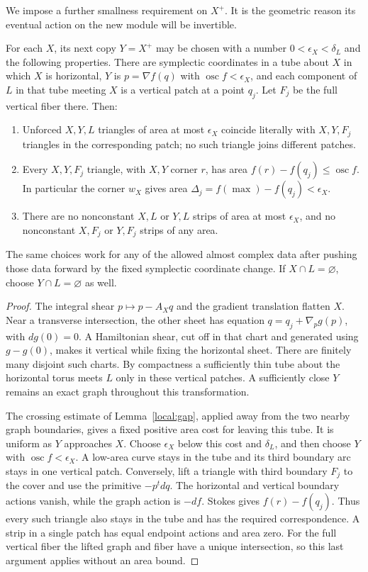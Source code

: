 We impose a further smallness requirement on $X^+$.  It is the geometric
reason its eventual action on the new module will be invertible.

\begin{lemma}\label{local:comparison}
For each $X$, its next copy $Y=X^+$ may be chosen with a number
$0<\epsilon_X<\delta_L$ and the following properties.  There are symplectic
coordinates in a tube about $X$ in which $X$ is horizontal, $Y$ is
$p=\nabla f(q)$ with $\operatorname{osc}f<\epsilon_X$, and each component
of $L$ in that tube meeting $X$ is a vertical patch at a point $q_j$.
Let $F_j$ be the full vertical fiber there.  Then:
\begin{enumerate}[label=(\roman*)]
\item Unforced $X,Y,L$ triangles of area at most $\epsilon_X$ coincide
literally with $X,Y,F_j$ triangles in the corresponding patch; no such
triangle joins different patches.
\item Every $X,Y,F_j$ triangle, with $X,Y$ corner $r$, has area
$f(r)-f(q_j)\leq\operatorname{osc}f$.  In particular the corner $w_X$
gives area $\Delta_j=f(\max)-f(q_j)<\epsilon_X$.
\item There are no nonconstant $X,L$ or $Y,L$ strips of area at most
$\epsilon_X$, and no nonconstant $X,F_j$ or $Y,F_j$ strips of any area.
\end{enumerate}
The same choices work for any of the allowed almost complex data after
pushing those data forward by the fixed symplectic coordinate change.
If $X\cap L=\varnothing$, choose $Y\cap L=\varnothing$ as well.
\end{lemma}
\begin{proof}
The integral shear $p\mapsto p-A_Xq$ and the gradient translation flatten
$X$.  Near a transverse intersection, the other sheet has equation
$q=q_j+\nabla_pg(p)$, with $dg(0)=0$.  A Hamiltonian shear, cut off in that
chart and generated using $g-g(0)$, makes it vertical while fixing the
horizontal sheet.  There are finitely many disjoint such charts.  By
compactness a sufficiently thin tube about the horizontal torus meets
$L$ only in these vertical patches.  A sufficiently close $Y$ remains an
exact graph throughout this transformation.

The crossing estimate of Lemma~\ref{local:gap}, applied away from the two
nearby graph boundaries, gives a fixed positive area cost for leaving
this tube.  It is uniform as $Y$ approaches $X$.  Choose $\epsilon_X$
below this cost and $\delta_L$, and then choose $Y$ with
$\operatorname{osc}f<\epsilon_X$.  A low-area curve stays in the tube and
its third boundary arc stays in one vertical patch.  Conversely, lift a
triangle with third boundary $F_j$ to the cover and use the primitive
$-p^tdq$.  The horizontal and vertical boundary actions vanish, while
the graph action is $-df$.  Stokes gives $f(r)-f(q_j)$.  Thus every such
triangle also stays in the tube and has the required correspondence.
A strip in a single patch has equal endpoint actions and area zero.
For the full vertical fiber the lifted graph and fiber have a unique
intersection, so this last argument applies without an area bound.
\end{proof}

